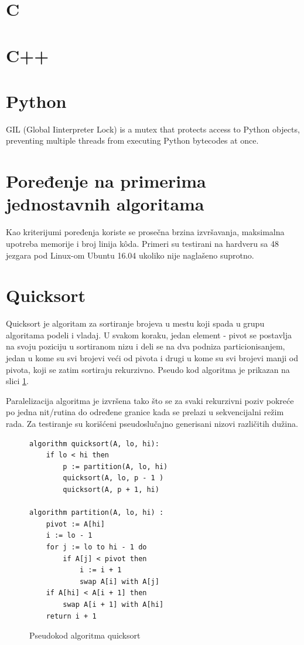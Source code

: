 \documentclass[12pt,oneside]{memoir}
\begin{document}
\section{C}

\section{C++}

\section{Python}
\label{gil} GIL (Global Iinterpreter Lock) is a mutex that protects access to Python objects, preventing multiple threads from executing Python bytecodes at once.

\section{Poređenje na primerima jednostavnih algoritama}
Kao kriterijumi poređenja koriste se prosečna brzina izvršavanja, maksimalna upotreba memorije i broj linija k\^{o}da. Primeri su testirani na hardveru sa 48 jezgara pod Linux-om Ubuntu 16.04 ukoliko nije naglašeno suprotno. 



\section{Quicksort}
Quicksort je algoritam za sortiranje brojeva u mestu koji spada u grupu algoritama podeli i vladaj. U svakom koraku, jedan element - pivot se postavlja na svoju poziciju u sortiranom nizu i deli se na dva podniza particionisanjem, jedan u kome su svi brojevi veći od pivota i drugi u kome su svi brojevi manji od pivota, koji se zatim sortiraju rekurzivno.  Pseudo kod algoritma je prikazan na slici \ref{fig:qs_pseudo}. 

Paralelizacija algoritma je izvršena tako što se za svaki rekurzivni poziv pokreće po jedna nit/rutina do određene granice kada se prelazi u sekvencijalni režim rada. Za testiranje su korišćeni pseudoslučajno generisani nizovi različitih dužina.

\begin{figure}
\begin{center}

\begin{Verbatim}[fontsize=\small]
algorithm quicksort(A, lo, hi):
    if lo < hi then
        p := partition(A, lo, hi)
        quicksort(A, lo, p - 1 )
        quicksort(A, p + 1, hi)

algorithm partition(A, lo, hi) :
    pivot := A[hi]
    i := lo - 1    
    for j := lo to hi - 1 do
        if A[j] < pivot then
            i := i + 1
            swap A[i] with A[j]
    if A[hi] < A[i + 1] then
        swap A[i + 1] with A[hi]
    return i + 1
\end{Verbatim}

\caption{Pseudokod algoritma quicksort}
\label{fig:qs_pseudo}
\end{center}
\end{figure}
\end{document}
